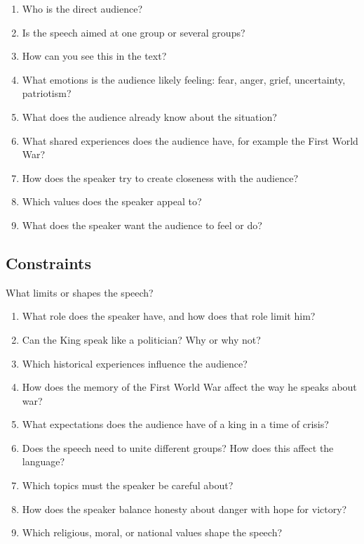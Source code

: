 \documentclass[10pt,a4paper,table]{article}
\begin{document}
\begin{enumerate}[label=\arabic*., leftmargin=*]
  \item Who is the direct audience?
  \item Is the speech aimed at one group or several groups?
  \item How can you see this in the text?
  \item What emotions is the audience likely feeling: fear, anger, grief, uncertainty, patriotism?
  \item What does the audience already know about the situation?
  \item What shared experiences does the audience have, for example the First World War?
  \item How does the speaker try to create closeness with the audience?
  \item Which values does the speaker appeal to?
  \item What does the speaker want the audience to feel or do?
\end{enumerate}

\subsection{Constraints}
What limits or shapes the speech?

\begin{enumerate}[label=\arabic*., leftmargin=*]
  \item What role does the speaker have, and how does that role limit him?
  \item Can the King speak like a politician? Why or why not?
  \item Which historical experiences influence the audience?
  \item How does the memory of the First World War affect the way he speaks about war?
  \item What expectations does the audience have of a king in a time of crisis?
  \item Does the speech need to unite different groups? How does this affect the language?
  \item Which topics must the speaker be careful about?
  \item How does the speaker balance honesty about danger with hope for victory?
  \item Which religious, moral, or national values shape the speech?
\end{enumerate}
\end{document}
